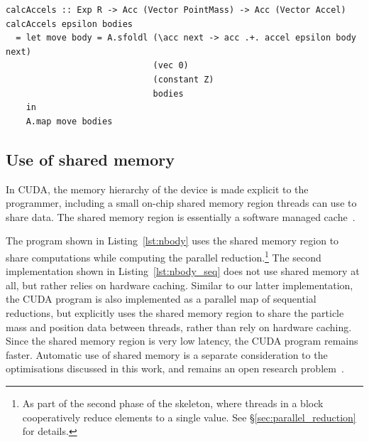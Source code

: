 \begin{lstlisting}[style=haskell_float
    ,label=lst:nbody_seq
    ,caption={$N$-body gravitational simulation, using sequential reduction}]
calcAccels :: Exp R -> Acc (Vector PointMass) -> Acc (Vector Accel)
calcAccels epsilon bodies
  = let move body = A.sfoldl (\acc next -> acc .+. accel epsilon body next)
                             (vec 0)
                             (constant Z)
                             bodies
    in
    A.map move bodies
\end{lstlisting}


\subsection{Use of shared memory}

In CUDA, the memory hierarchy of the device is made explicit to the programmer,
including a small on-chip shared memory region threads can
use to share data. The shared memory region is essentially a software managed
cache~\cite{NVIDIA:2012wf}.

The program shown in Listing~\ref{lst:nbody} uses the shared memory region to
share computations while computing the parallel reduction.\footnote{As part of
the second phase of the  skeleton, where threads in a block
cooperatively reduce elements to a single value. See
\S\ref{sec:parallel_reduction} for details.}
The second implementation shown in Listing~\ref{lst:nbody_seq} does not use
shared memory at all, but rather relies on hardware caching. Similar to our
latter implementation, the CUDA program is also implemented as a parallel map of
sequential reductions, but explicitly uses the shared memory region to share the
particle mass and position data between threads, rather than rely on hardware
caching. Since the shared memory region is very low latency, the CUDA program
remains faster. Automatic use of shared memory is a separate consideration to
the optimisations discussed in this work, and remains an open research
problem~\cite{Ma:2010ft}.



